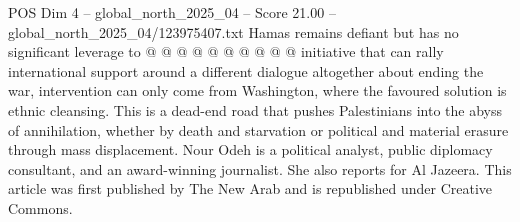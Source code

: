 \begin{textsample}{POS Dim 4 – global\_north\_2025\_04 – Score 21.00 – global\_north\_2025\_04/123975407.txt}
Hamas remains defiant but has no significant leverage to @ @ @ @ @ @ @ @ @ @ initiative that can rally international support around a different dialogue altogether about ending the war, intervention can only come from Washington, where the favoured solution is ethnic cleansing.
This is a dead-end road that pushes Palestinians into the abyss of annihilation, whether by death and starvation or political and material erasure through mass displacement.
Nour Odeh is a political analyst, public diplomacy consultant, and an award-winning journalist.
She also reports for Al Jazeera.
This article was first published by The New Arab and is republished under Creative Commons.

\end{textsample}

